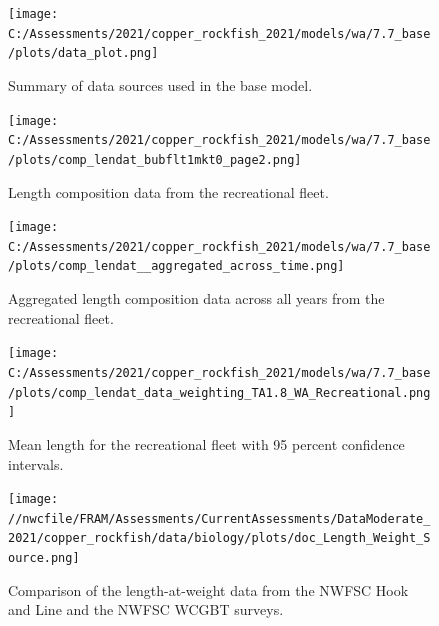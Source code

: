 \documentclass[11pt,
  english,
  a4paper,
]{article}
\begin{document}
\tagmcend\tagstructend


\begin{figure}
\centering
\texttt{[image: C:/Assessments/2021/copper\_rockfish\_2021/models/wa/7.7\_base/plots/data\_plot.png]}
\caption{Summary of data sources used in the base model.\label{fig:data-plot}}
\end{figure}

\tagmcend\tagstructend


\begin{figure}
\centering
\texttt{[image: C:/Assessments/2021/copper\_rockfish\_2021/models/wa/7.7\_base/plots/comp\_lendat\_bubflt1mkt0\_page2.png]}
\caption{Length composition data from the recreational fleet.\label{fig:wa-len-data}}
\end{figure}

\tagmcend\tagstructend


\begin{figure}
\centering
\texttt{[image: C:/Assessments/2021/copper\_rockfish\_2021/models/wa/7.7\_base/plots/comp\_lendat\_\_aggregated\_across\_time.png]}
\caption{Aggregated length composition data across all years from the recreational fleet.\label{fig:wa-len-agg}}
\end{figure}

\tagmcend\tagstructend


\begin{figure}
\centering
\texttt{[image: C:/Assessments/2021/copper\_rockfish\_2021/models/wa/7.7\_base/plots/comp\_lendat\_data\_weighting\_TA1.8\_WA\_Recreational.png]}
\caption{Mean length for the recreational fleet with 95 percent confidence intervals.\label{fig:mean-len-data}}
\end{figure}

\tagmcend\tagstructend


\begin{figure}
\centering
\texttt{[image: //nwcfile/FRAM/Assessments/CurrentAssessments/DataModerate\_2021/copper\_rockfish/data/biology/plots/doc\_Length\_Weight\_Source.png]}
\caption{Comparison of the length-at-weight data from the NWFSC Hook and Line and the NWFSC WCGBT surveys.\label{fig:len-weight-survey}}
\end{figure}
\end{document}
